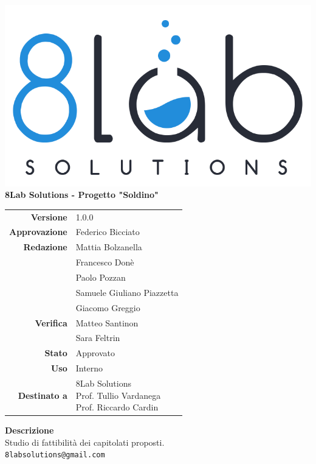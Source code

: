 \thispagestyle{empty}
\begin{titlepage}
	\begin{center}
		\includegraphics[scale = 0.3]{res/images/logo8_crop.png}\\
		\large \textbf{8Lab Solutions - Progetto "Soldino"} \\
		\vfill
		\Huge \textbf{\doctitle}
		\vspace*{\fill}
        
        \vfill
        \large
        \begin{tabular}{r|l}
                        \textbf{Versione} & 1.0.0 \\
                        \textbf{Approvazione} & Federico Bicciato \\
                        \textbf{Redazione} &  Mattia Bolzanella \\ &
                        	Francesco Donè\\&
                        	Paolo Pozzan\\&
                        	Samuele Giuliano Piazzetta\\&
                        	Giacomo Greggio\\
                        \textbf{Verifica} & Matteo Santinon \\&
                        	Sara Feltrin \\
                        \textbf{Stato} & Approvato \\
                        \textbf{Uso} & Interno \\
                        \textbf{Destinato a} & \parbox[t]{5cm}{8Lab Solutions
                        \\Prof. Tullio Vardanega\\Prof. Riccardo Cardin}
                \end{tabular}
                \vfill
                \normalsize
                \textbf{Descrizione}\\
                Studio di fattibilità dei capitolati proposti.\\
                \vfill
                \small
                \texttt{8labsolutions@gmail.com}
	\end{center}
\end{titlepage}